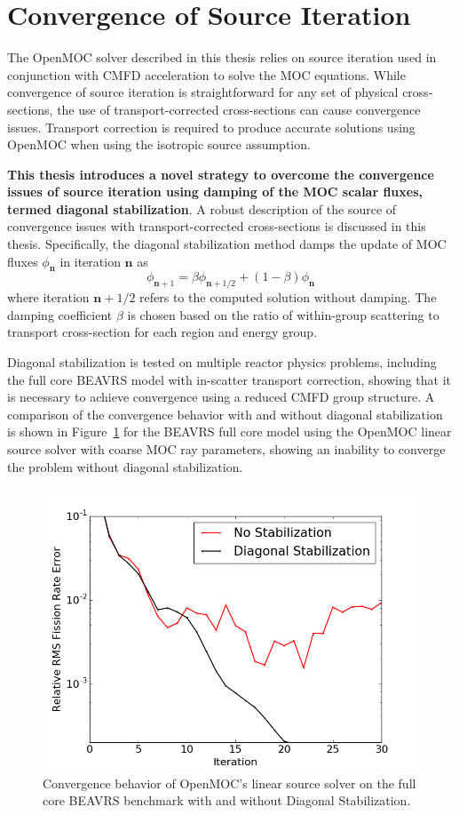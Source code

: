 \documentclass[12pt,twoside]{mitthesis-exec}
\begin{document}
\section*{Convergence of Source Iteration}

The OpenMOC solver described in this thesis relies on source iteration used in conjunction with CMFD acceleration to solve the MOC equations. While convergence of source iteration is straightforward for any set of physical cross-sections, the use of transport-corrected cross-sections can cause convergence issues. Transport correction is required to produce accurate solutions using OpenMOC when using the isotropic source assumption.

\textbf{This thesis introduces a novel strategy to overcome the convergence issues of source iteration using damping of the MOC scalar fluxes, termed diagonal stabilization}. A robust description of the source of convergence issues with transport-corrected cross-sections is discussed in this thesis. Specifically, the diagonal stabilization method damps the update of MOC fluxes $\phi_{\mathbf{n}}$ in iteration $\mathbf{n}$ as
\begin{equation}
\nonumber
\phi_{\mathbf{n}+1} = \beta \phi_{\mathbf{n}+1/2} + (1-\beta) \phi_{\mathbf{n}} 
\end{equation}
where iteration $\mathbf{n}+1/2$ refers to the computed solution without damping. The damping coefficient $\beta$ is chosen based on the ratio of within-group scattering to transport cross-section for each region and energy group.

Diagonal stabilization is tested on multiple reactor physics problems, including the full core BEAVRS model with in-scatter transport correction, showing that it is necessary to achieve convergence using a reduced CMFD group structure. A comparison of the convergence behavior with and without diagonal stabilization is shown in Figure~\ref{fig:fc-3D-ls} for the BEAVRS full core model using the OpenMOC linear source solver with coarse MOC ray parameters, showing an inability to converge the problem without diagonal stabilization.
	
\begin{figure}[ht!]
	\centering
	\includegraphics[width=0.65\linewidth]{figures/convergence/full-core-3D-ls.png}
	\caption{Convergence behavior of OpenMOC's linear source solver on the full core BEAVRS benchmark with and without Diagonal Stabilization.}
	\label{fig:fc-3D-ls}
\end{figure}
\end{document}

